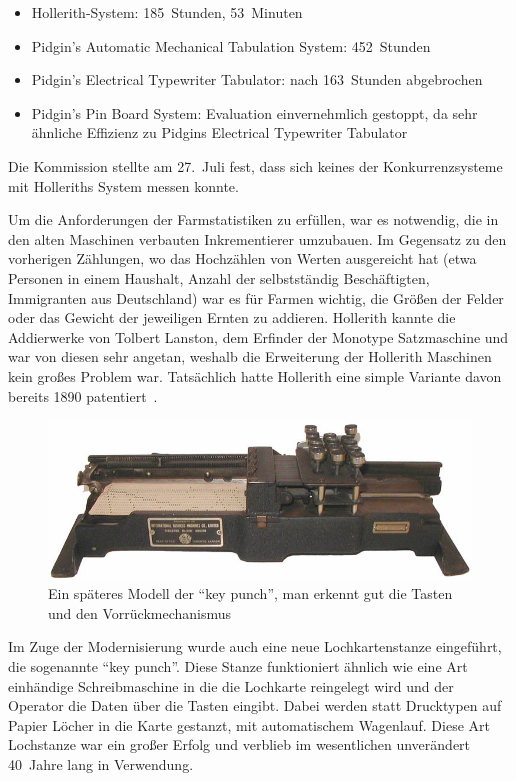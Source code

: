 \documentclass[parskip=half]{scrartcl}
\begin{document}
\begin{itemize}
  \item Hollerith-System: 185~Stunden, 53~Minuten
  \item Pidgin's Automatic Mechanical Tabulation System: 452~Stunden
  \item Pidgin's Electrical Typewriter Tabulator: nach 163~Stunden abgebrochen
  \item Pidgin's Pin Board System: Evaluation einvernehmlich gestoppt, da sehr
    ähnliche Effizienz zu Pidgins Electrical Typewriter Tabulator
\end{itemize}

Die Kommission stellte am 27.~Juli fest, dass sich keines der Konkurrenzsysteme
mit Holleriths System messen konnte.

Um die Anforderungen der Farmstatistiken zu erfüllen, war es notwendig, die in
den alten Maschinen verbauten Inkrementierer umzubauen. Im
Gegensatz zu den vorherigen Zählungen, wo das Hochzählen von Werten ausgereicht
hat (etwa Personen in einem Haushalt, Anzahl der selbstständig Beschäftigten,
Immigranten aus Deutschland) war es für Farmen wichtig, die Größen der Felder
oder das Gewicht der jeweiligen Ernten zu addieren. Hollerith kannte die
Addierwerke von Tolbert Lanston, dem Erfinder der Monotype Satzmaschine und war
von diesen sehr angetan, weshalb die Erweiterung der Hollerith Maschinen kein
großes Problem war. Tatsächlich hatte Hollerith eine simple Variante davon bereits
1890 patentiert~\cite{truesdell1965development}.

\begin{figure}[h]
  \centering
  \includegraphics[width=\textwidth]{keypunch}
  \caption{Ein späteres Modell der \enquote{key punch}, man erkennt gut die
    Tasten und den Vorrückmechanismus~\cite{keypunch}}
  \label{fig:keypunch}
\end{figure}

Im Zuge der Modernisierung wurde auch eine neue Lochkartenstanze eingeführt,
die sogenannte \enquote{key punch}. Diese Stanze funktioniert ähnlich wie eine
Art einhändige Schreibmaschine in die die Lochkarte reingelegt wird und der
Operator die Daten über die Tasten eingibt. Dabei werden statt Drucktypen auf
Papier Löcher in die Karte gestanzt, mit automatischem Wagenlauf. Diese Art
Lochstanze war ein großer Erfolg und verblieb im wesentlichen unverändert
40~Jahre lang in Verwendung.
\end{document}
